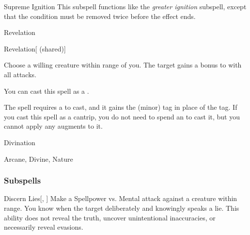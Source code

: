 \begin{ability}[\nth{9}]{Supreme Ignition}
This subspell functions like the \textit{greater ignition} subspell, except that the condition must be removed twice before the effect ends.
\end{ability}
\vspace{0.25em}

\newpage
\begin{spellsection}{Revelation}

\begin{spellheader}
\end{spellheader}


\begin{ability}{Revelation}[ (shared)]

Choose a willing creature within \rngclose range of you.
The target gains a  bonus to  with all attacks.

You can cast this spell as a .

\end{ability}



 The spell requires a  to cast, and it gains the  (minor) tag in place of the  tag. If you cast this spell as a cantrip,
you do not need to spend an  to cast it,
but you cannot apply any augments to it.


 Divination

 Arcane, Divine, Nature
\end{spellsection}


\subsubsection{Subspells}


\begin{ability}[\nth{2}]{Discern Lies}[, ]
Make a Spellpower vs. Mental attack against a creature within \rngmed range.
\hit You know when the target deliberately and knowingly speaks a lie.
This ability does not reveal the truth, uncover unintentional inaccuracies, or necessarily reveal evasions.
\end{ability}
\vspace{0.25em}


